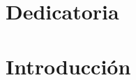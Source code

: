 \documentclass[12pt]{report} %
\begin{document}
\newpage %
\thispagestyle{empty}
\mbox{}

\renewcommand\abstractname{\large\bfseries\filcenter\uppercase{Resumen}}
\begin{abstract}
\thispagestyle{plain}
\setcounter{page}{3}
	
	
	\textbf{Palabras clave:}
	
	\vfill
\end{abstract}

	\newpage %
	\thispagestyle{empty}
	\mbox{}


\chapter*{Dedicatoria} %

\setcounter{page}{5}
	
		
	\vfill
	
	\newpage %
	\thispagestyle{empty}
	\mbox{}
	


\tableofcontents
\thispagestyle{fancy}

\newpage %
\thispagestyle{empty}
\mbox{}

\listoffigures
\thispagestyle{fancy}

\newpage %
\thispagestyle{empty}
\mbox{}

\listoftables
\thispagestyle{fancy}

\newpage %
\thispagestyle{empty}
\mbox{}


\clearpage
{} %

\chapter{Introducción}
\end{document}
